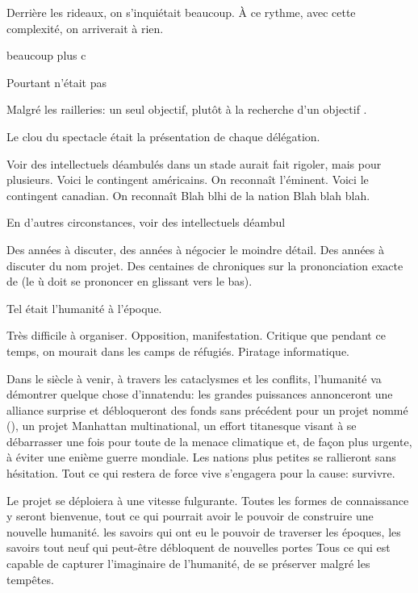 Derrière les rideaux, on s'inquiétait beaucoup.
À ce rythme, avec cette complexité, on arriverait à rien.

beaucoup plus c

Pourtant \nomProjet{} n'était pas 


Malgré les railleries: un seul objectif, plutôt \og à la recherche d'un objectif \fg.





Le clou du spectacle était la présentation de chaque délégation.



Voir des intellectuels déambulés dans un stade aurait fait rigoler, mais pour
plusieurs. Voici le contingent américains. On reconnaît l'éminent.
Voici le contingent canadian. 
On reconnaît Blah blhi de la nation Blah blah blah.

En d'autres circonstances, 
voir des intellectuels déambul

Des années à discuter, des années à négocier le moindre détail. 
Des années à discuter du nom projet. Des centaines de chroniques
sur la prononciation exacte de \nomProjet{} (le \og ù \fg doit se prononcer en glissant vers le bas).

Tel était l'humanité à l'époque.

Très difficile à organiser.  Opposition, manifestation. Critique que pendant ce
temps, on mourait dans les camps de réfugiés.
Piratage informatique.


Dans le siècle à venir, à travers les cataclysmes et les conflits, l'humanité
va démontrer quelque chose d'innatendu: les grandes puissances annonceront une
alliance surprise et débloqueront des fonds sans précédent pour un projet nommé
\textit{\nomProjet{}} (\nomProjetEn{}), un projet Manhattan multinational, un
effort titanesque visant à se débarrasser une fois pour toute de la menace
climatique et, de façon plus urgente, à éviter une enième guerre mondiale.  Les
nations plus petites se rallieront sans hésitation.  Tout ce qui restera de
force vive s'engagera pour la cause: survivre.

Le projet \nomProjet{} se déploiera à une vitesse fulgurante.  Toutes les
formes de connaissance y seront bienvenue, tout ce qui pourrait avoir le
pouvoir de construire une nouvelle humanité.  les savoirs qui ont eu le pouvoir
de traverser les époques, les savoirs tout neuf qui peut-être débloquent de
nouvelles portes Tous ce qui est capable de capturer l'imaginaire de
l'humanité, de se préserver malgré les tempêtes.



